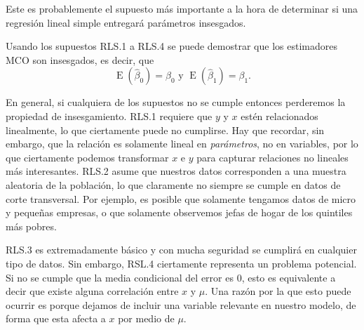 \documentclass{report}\usepackage[]{graphicx}\usepackage[]{color}
\newcommand{\E}{\operatorname{E}}
\begin{document}
Este es probablemente el supuesto más importante a la hora de determinar si una regresión lineal simple entregará parámetros insesgados.


\hrulefill

Usando los supuestos RLS.1 a RLS.4 se puede demostrar que los estimadores MCO son insesgados, es decir, que
\begin{equation}
\E(\hat\beta_0) = \beta_0 \text{ y } \E(\hat\beta_1) = \beta_1.
\end{equation}

En general, si cualquiera de los supuestos no se cumple entonces perderemos la propiedad de insesgamiento. RLS.1 requiere que $y$ y $x$ estén relacionados linealmente, lo que ciertamente puede no cumplirse. Hay que recordar, sin embargo, que la relación es solamente lineal en \emph{parámetros}, no en variables, por lo que ciertamente podemos transformar $x$ e $y$ para capturar relaciones no lineales más interesantes.
RLS.2 asume que nuestros datos corresponden a una muestra aleatoria de la población, lo que claramente no siempre se cumple en datos de corte transversal. Por ejemplo, es posible que solamente tengamos datos de micro y pequeñas empresas, o que solamente observemos jefas de hogar de los quintiles más pobres.

RLS.3 es extremadamente básico y con mucha seguridad se cumplirá en cualquier tipo de datos. Sin embargo, RSL.4 ciertamente representa un problema potencial. Si no se cumple que la media condicional del error es 0, esto es equivalente a decir que existe alguna correlación entre $x$ y $\mu$.
Una razón por la que esto puede ocurrir es porque dejamos de incluir una variable relevante en nuestro modelo, de forma que esta afecta a $x$ por medio de $\mu$.
\end{document}
